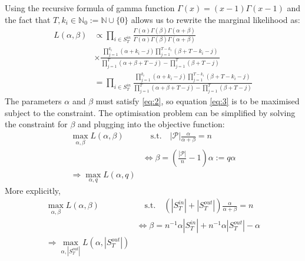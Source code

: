 \documentclass[a4paper, 12pt]{article}
\newcommand{\sout}{|S^{out}_T|}
\newcommand{\sint}{|S^{in}_T|}
\begin{document}
Using the recursive formula of gamma function $\Gamma(x) = (x - 1)\Gamma(x - 1)$ and the fact that $T, k_i \in \mathbb{N}_0 := \mathbb{N} \cup \{0\}$ allows us to rewrite the marginal likelihood as:
\begin{align*}
    L(\alpha, \beta) &\propto \prod_{i \in S_T^{in}} \frac{\Gamma(\alpha) \Gamma(\beta) \Gamma(\alpha + \beta)}{\Gamma(\alpha)\Gamma(\beta)\Gamma(\alpha + \beta)}\\
    &\times \frac{\prod_{j=1}^{k_i} (\alpha + k_i - j)\prod_{j=1}^{T - k_i} (\beta + T - k_i - j)}{\prod_{j=1}^T(\alpha + \beta + T - j) - \prod_{j=1}^T (\beta + T - j)} \\
    &= \prod_{i \in S_T^{in}} \frac{\prod_{j=1}^{k_i} (\alpha + k_i - j)\prod_{j=1}^{T - k_i} (\beta + T - k_i - j)}{\prod_{j=1}^T(\alpha + \beta + T - j) - \prod_{j=1}^T (\beta + T - j)} 
\end{align*}
The parameters $\alpha$ and $\beta$ must satisfy \eqref{eq:2}, so equation \eqref{eq:3} is to be maximised subject to the constraint. The optimisation problem can be simplified by solving the constraint for $\beta$ and plugging into the objective function:
\begin{align*}
    \max_{\alpha, \beta} L(\alpha, \beta) &\quad \text{s.t.} \quad |\mathcal{P}|\frac{\alpha}{\alpha + \beta} = n \\
    &\Leftrightarrow \beta = \left(\frac{|\mathcal{P}|}{n} - 1 \right)\alpha := q\alpha\\
    \Rightarrow \max_{\alpha, q} L(\alpha, q) &
\end{align*}
More explicitly,
\begin{align*}
    \max_{\alpha, \beta} L(\alpha, \beta) &\quad \text{s.t.} \quad (\sint + \sout)\frac{\alpha}{\alpha + \beta} = n \\
    &\Leftrightarrow \beta = n^{-1}\alpha\sint + n^{-1}\alpha\sout - \alpha\\
    \Rightarrow \max_{\alpha, \sout} L(\alpha, \sout) &
\end{align*}
\end{document}
